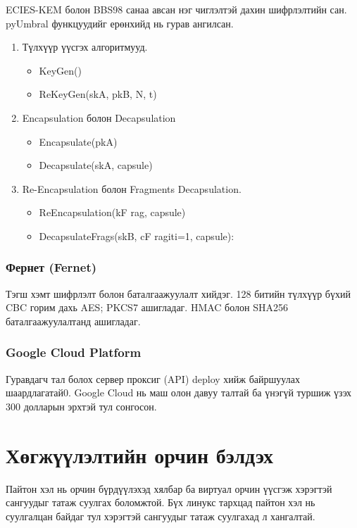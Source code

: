 ECIES-KEM болон BBS98 санаа авсан нэг чиглэлтэй дахин шифрлэлтийн сан. pyUmbral функцуудийг ерөнхийд нь гурав ангилсан.
\begin{enumerate}
    \item Түлхүүр үүсгэх алгоритмууд.
          \begin{itemize}
              \item KeyGen()
              \item ReKeyGen(skA, pkB, N, t)
          \end{itemize}
    \item Encapsulation болон Decapsulation
          \begin{itemize}
              \item Encapsulate(pkA)
              \item Decapsulate(skA, capsule)
          \end{itemize}
    \item Re-Encapsulation болон Fragments Decapsulation.
          \begin{itemize}
              \item ReEncapsulation(kF rag, capsule)
              \item DecapsulateFrags(skB, {cF ragi}ti=1, capsule):
          \end{itemize}
\end{enumerate}

\subsubsection*{\textbf{Фернет (Fernet)}}
Тэгш хэмт шифрлэлт  болон баталгаажуулалт хийдэг. 128 битийн түлхүүр бүхий CBC горим дахь AES; PKCS7 ашигладаг. HMAC болон SHA256 баталгаажуулалтанд ашигладаг.

\subsubsection*{\textbf{Google Cloud Platform}}
Гуравдагч тал болох сервер проксиг (API) deploy хийж байршуулах шаардлагатай0. Google Cloud нь маш олон давуу талтай ба үнэгүй туршиж үзэх 300 долларын эрхтэй тул сонгосон.

\section{Хөгжүүлэлтийн орчин бэлдэх}
Пайтон хэл нь орчин бүрдүүлэхэд хялбар ба виртуал орчин үүсгэж хэрэгтэй сангуудыг татаж суулгах боломжтой. Бүх линукс тархцад пайтон хэл нь суулгалцан байдаг тул хэрэгтэй сангуудыг татаж суулгахад л хангалтай.

